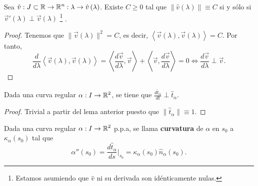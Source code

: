 \begin{lema}
Sea $\displaystyle \hat{v} : J \subset \mathbb{R} \to \mathbb{R}^{n} : \lambda \to \hat{v}\left(\lambda\right)$. Existe $\displaystyle C \geq 0 $ tal que $\displaystyle \|\hat{v}\left(\lambda \right)\| \equiv C $ si y sólo si $\displaystyle \vec{v}'\left(\lambda \right)\perp \vec{v}\left(\lambda \right) $ \footnote{Estamos asumiendo que $\displaystyle \hat{v} $ ni su derivada son idénticamente nulas.} . 
\end{lema}
\begin{proof}
Tenemos que $\displaystyle \|\vec{v}\left(\lambda \right)\|^{2} = C $, es decir, $\displaystyle \left\langle \vec{v}\left(\lambda \right), \vec{v}\left(\lambda \right) \right\rangle = C $. Por tanto, 
\[\frac{d}{d\lambda }\left\langle \vec{v}\left(\lambda \right), \vec{v}\left(\lambda \right) \right\rangle = \left\langle \frac{d\vec{v}}{d\lambda }, \vec{v} \right\rangle +\left\langle \vec{v},\frac{d\vec{v}}{d\lambda}  \right\rangle =  0 \iff \frac{d\vec{v}}{d\lambda }\perp \vec{v} .\]
\end{proof}
\begin{colorary}
Dada una curva regular $\displaystyle \alpha : I \to \mathbb{R}^{2} $, se tiene que $\displaystyle \frac{d\hat{t}_{\alpha }}{dt}\perp \hat{t}_{\alpha } $.
\end{colorary}
\begin{proof}
Trivial a partir del lema anterior puesto que $\displaystyle \|\hat{t}_{\alpha }\| \equiv 1 $. 
\end{proof}
\begin{definition}[Curvatura]
Dada una curva regular $\displaystyle \alpha : I \to \mathbb{R}^{2} $ p.p.a, se llama \textbf{curvatura} de $\displaystyle \alpha  $ en $\displaystyle s_{0} $ a $\displaystyle \kappa_{\alpha }\left(s_{0}\right) $ tal que
\[\alpha''\left(s_{0}\right)=\frac{d\hat{t}_{\alpha }}{d s}|_{s_{0}} = \kappa_{\alpha }\left(s_{0}\right) \hat{n}_{\alpha }\left(s_{0}\right) .\]
\end{definition}

